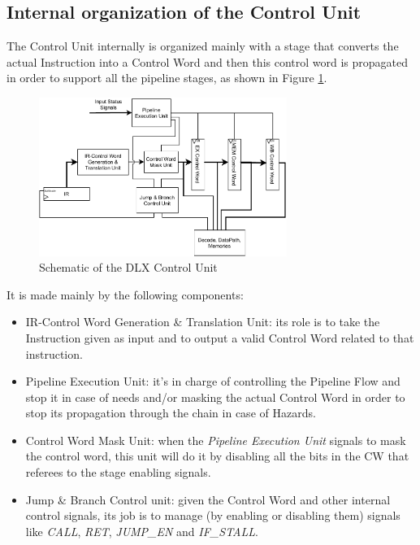\subsection{Internal organization of the Control Unit}

The Control Unit internally is organized mainly with a stage that converts the actual Instruction into a Control Word and then this control word is propagated in order to support all the pipeline stages, as shown in Figure \ref{dlx:cu:schematic}.

\begin{figure}[H]
    \centering
    \includegraphics[width=0.72\textwidth]{chapters/2_dlx/images/DLX-Cu.pdf}
    \caption{Schematic of the DLX Control Unit}
    \label{dlx:cu:schematic}
\end{figure} 

It is made mainly by the following components:

\begin{itemize}
    \item IR-Control Word Generation \& Translation Unit: its role is to take the Instruction given as input and to output a valid Control Word related to that instruction.
    \item Pipeline Execution Unit: it's in charge of controlling the Pipeline Flow and stop it in case of needs and/or masking the actual Control Word in order to stop its propagation through the chain in case of Hazards.
    \item Control Word Mask Unit: when the \emph{Pipeline Execution Unit} signals to mask the control word, this unit will do it by disabling all the bits in the CW that referees to the stage enabling signals.
    \item Jump \& Branch Control unit: given the Control Word and other internal control signals, its job is to manage (by enabling or disabling them) signals like \emph{CALL}, \emph{RET}, \emph{JUMP\_EN} and \emph{IF\_STALL}.
\end{itemize}

